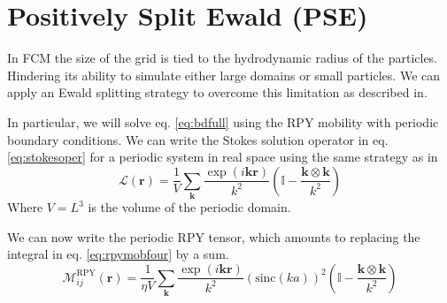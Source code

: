 \documentclass[ twoside,openright,titlepage,numbers=noenddot,%
headinclude,footinclude,cleardoublepage=empty,abstract=on,
BCOR=5mm,paper=a4,fontsize=11pt, dvipsnames
]{scrreprt}
\renewcommand{\vec}[1]{\bm{#1}}
\newcommand{\tens}[1]{\bm{\mathcal{#1}}}
\newcommand{\oper}[1]{\mathcal{#1}}
\newcommand{\sinc}{\textrm{sinc}}
\newcommand{\fpos}{r}
\begin{document}
\newpage

\section{Positively Split Ewald (PSE)}\label{sec:pse}
In \gls{FCM} the size of the grid is tied to the hydrodynamic radius of the particles. Hindering its ability to simulate either large domains or small particles.
We can apply an Ewald splitting strategy to overcome this limitation as described in\cite{Fiore2017}.

In particular, we will solve eq. \eqref{eq:bdfull} using the \gls{RPY} mobility with periodic boundary conditions. We can write the Stokes solution operator in eq. \eqref{eq:stokesoper} for a periodic system in real space using the same strategy as in\cite{Hasimoto1959}
\begin{equation}
  \label{eq:psestokesoper}
  \oper{L}(\vec{\fpos}) = \frac{1}{V}\sum_{\vec{k}} \frac{\exp(i\vec{k}\vec{r})}{k^2}\left(\mathbb{I} - \frac{\vec{k}\otimes\vec{k}}{k^2}\right)
\end{equation}
Where $V = L^3$ is the volume of the periodic domain.

We can now write the periodic \gls{RPY} tensor, which amounts to replacing the integral in eq. \eqref{eq:rpymobfour} by a sum.
\begin{equation}
  \label{eq:pserpyfou}
  \tens{M}_{ij}^{\textrm{RPY}}(\vec{r})= \frac{1}{\eta V} \sum_{\vec{k}} \frac{\exp(i\vec{k}\vec{r})}{k^2}\left(\sinc(ka) \right)^2\left(\mathbb{I} - \frac{\vec{k}\otimes\vec{k}}{k^2}\right)
\end{equation}
\end{document}

